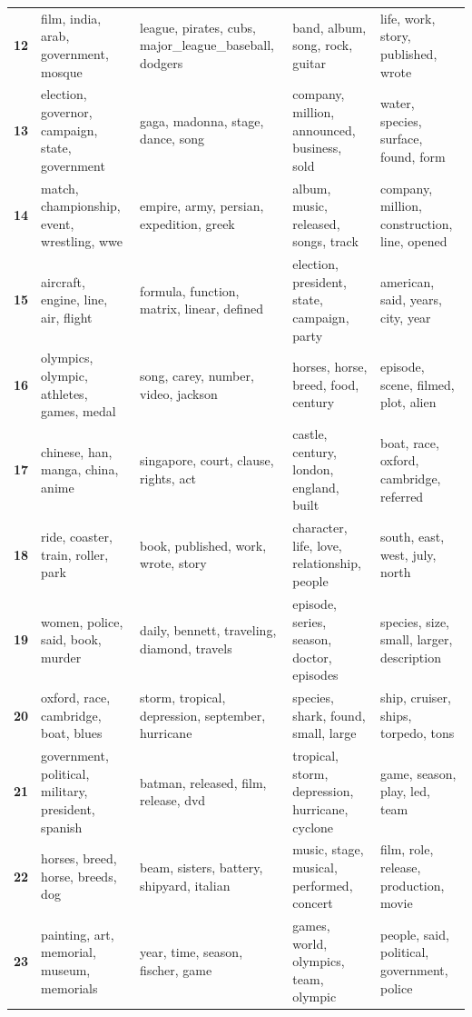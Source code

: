 \begin{xltabular}{\textwidth}{@{}l >{\RaggedRight\arraybackslash}X >{\RaggedRight\arraybackslash}X >{\RaggedRight\arraybackslash}X >{\RaggedRight\arraybackslash}X@{}}
    \textbf{12} & film, india, arab, government, mosque & league, pirates, cubs, major\_league\_baseball, dodgers & band, album, song, rock, guitar & life, work, story, published, wrote \\
    \textbf{13} & election, governor, campaign, state, government & gaga, madonna, stage, dance, song & company, million, announced, business, sold & water, species, surface, found, form \\
    \textbf{14} & match, championship, event, wrestling, wwe & empire, army, persian, expedition, greek & album, music, released, songs, track & company, million, construction, line, opened \\
    \textbf{15} & aircraft, engine, line, air, flight & formula, function, matrix, linear, defined & election, president, state, campaign, party & american, said, years, city, year \\
    \textbf{16} & olympics, olympic, athletes, games, medal & song, carey, number, video, jackson & horses, horse, breed, food, century & episode, scene, filmed, plot, alien \\
    \textbf{17} & chinese, han, manga, china, anime & singapore, court, clause, rights, act & castle, century, london, england, built & boat, race, oxford, cambridge, referred \\
    \textbf{18} & ride, coaster, train, roller, park & book, published, work, wrote, story & character, life, love, relationship, people & south, east, west, july, north \\
    \textbf{19} & women, police, said, book, murder & daily, bennett, traveling, diamond, travels & episode, series, season, doctor, episodes & species, size, small, larger, description \\
    \textbf{20} & oxford, race, cambridge, boat, blues & storm, tropical, depression, september, hurricane & species, shark, found, small, large & ship, cruiser, ships, torpedo, tons \\
    \textbf{21} & government, political, military, president, spanish & batman, released, film, release, dvd & tropical, storm, depression, hurricane, cyclone & game, season, play, led, team \\
    \textbf{22} & horses, breed, horse, breeds, dog & beam, sisters, battery, shipyard, italian & music, stage, musical, performed, concert & film, role, release, production, movie \\
    \textbf{23} & painting, art, memorial, museum, memorials & year, time, season, fischer, game & games, world, olympics, team, olympic & people, said, political, government, police \\

\end{xltabular}
